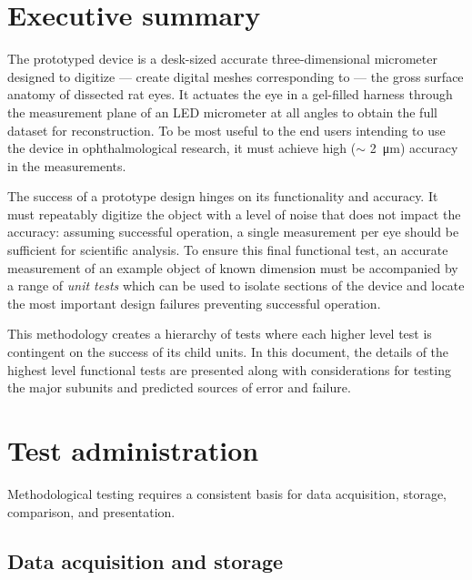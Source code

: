 \documentclass{article}
\begin{document}

\setcounter{tocdepth}{3}
\tableofcontents
\newpage

\section*{Executive summary}
\label{sec:exec-summary}


\newpage

The prototyped device is a desk-sized accurate three-dimensional micrometer designed to digitize --- create digital meshes corresponding to --- the gross surface anatomy of dissected rat eyes. It actuates the eye in a gel-filled harness through the measurement plane of an LED micrometer at all angles to obtain the full dataset for reconstruction. To be most useful to the end users intending to use the device in ophthalmological research, it must achieve high ($\sim$ \SI{2}{\micro m}) accuracy in the measurements.

The success of a prototype design hinges on its functionality and accuracy. It must repeatably digitize the object with a level of noise that does not impact the accuracy: assuming successful operation, a single measurement per eye should  be sufficient for scientific analysis. To ensure this final functional test, an accurate measurement of an example object of known dimension must be accompanied by a range of \textit{unit tests} which can be used to isolate sections of the device and locate the most important design failures preventing successful operation.

This methodology creates a hierarchy of tests where each higher level test is contingent on the success of its child units. In this document, the details of the highest level functional tests are presented along with considerations for testing the major subunits and predicted sources of error and failure.

\section{Test administration}
\label{sec:test-administration}

Methodological testing requires a consistent basis for data acquisition, storage, comparison, and presentation.

\subsection{Data acquisition and storage}
\label{sec:data-acqu-stor}
\end{document}
